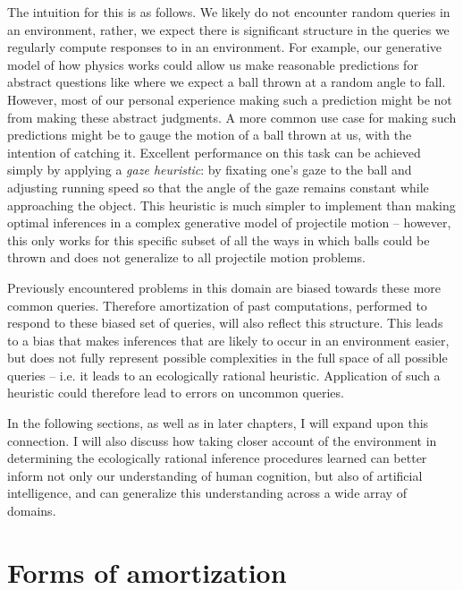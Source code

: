 The intuition for this is as follows. We likely do not encounter random queries in an environment, rather, we expect there is significant structure in the queries we regularly compute responses to in an environment. For example, our generative model of how physics works could allow us make reasonable predictions for abstract questions like where we expect a ball thrown at a random angle to fall. However, most of our personal experience making such a prediction might be not from making these abstract judgments. A more common use case for making such predictions might be to gauge the motion of a ball thrown at us, with the intention of catching it. Excellent performance on this task can be achieved simply by applying a \textit{gaze heuristic}\cite{gigerenzer2009homo}: by fixating one's gaze to the ball and adjusting running speed so that the angle of the gaze remains constant while approaching the object. This heuristic is much simpler to implement than making optimal inferences in a complex generative model of projectile motion -- however, this only works for this specific subset of all the ways in which balls could be thrown and does not generalize to all projectile motion problems.

Previously encountered problems in this domain are biased towards these more common queries. Therefore amortization of past computations, performed to respond to these biased set of queries, will also reflect this structure. This leads to a bias that makes inferences that are likely to occur in an environment easier, but does not fully represent possible complexities in the full space of all possible queries -- i.e. it leads to an ecologically rational heuristic. Application of such a heuristic could therefore lead to errors on uncommon queries.

In the following sections, as well as in later chapters, I will expand upon this connection. I will also discuss how taking closer account of the environment in determining the ecologically rational inference procedures learned can better inform not only our understanding of human cognition, but also of artificial intelligence, and can generalize this understanding across a wide array of domains.



\section{Forms of amortization}

